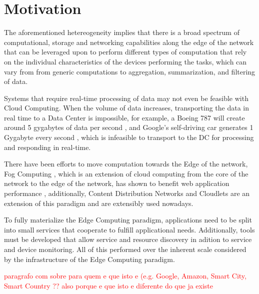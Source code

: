 \section{Motivation}

The aforementioned hetereogeneity implies that there is a broad spectrum of
computational, storage and networking capabilities along the edge of the network that
can be leveraged upon to perform different types of computation that rely on the individual
characteristics of the devices performing the tasks, which can vary from
from generic computations to aggregation, summarization, and filtering of data. \cite{DBLP:journals/corr/abs-1805-06989}

Systems that require real-time processing of data may not even be feasible with Cloud Computing. 
When the volume of data increases, transporting the data in real time to a Data Center is impossible, for example,
a  Boeing 787 will create around 5 gygabytes of data per second \cite{finnegan_2013}, and Google's self-driving
car generates 1 Gygabyte every second \cite{datafloq}, which is infeasible to transport to the DC for processing
and responding in real-time.


There have been efforts to move computation towards the Edge of the network, Fog Computing \cite{yi2015fog}, which is
an extension of cloud computing from the core of the network to the edge of the network, has shown to benefit
web application performance \cite{Improving_Web_Sites_Performance_Using_Edge_Servers_in_Fog_Computing_Architecture}, 
additionally, Content Distribution Networks \cite{} and Cloudlets \cite{} 
are an extension of this paradigm and are extensibly used nowadays.

To fully materialize the Edge Computing paradigm, applications need to be split into small services
that cooperate to fulfill applicational needs. Additionally, tools must be
developed that allow service and resource discovery in adition to service and device
monitoring. All of this performed over the inherent scale considered by the
infrastructure of the Edge Computing paradigm.

\textcolor{red}{paragrafo com sobre para quem e que isto e (e.g. Google, Amazon, Smart City, Smart Country ?? also porque e que isto e diferente do que ja existe}

